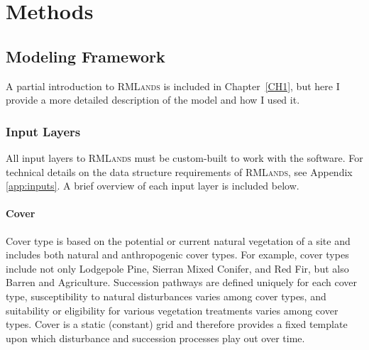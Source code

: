 
\section{Methods}
\label{sec:hrvmethods}


\subsection{Modeling Framework}
\label{sec:modelframe}

A partial introduction to \textsc{RMLands} is included in Chapter~\ref{CH1}, but here I provide a more detailed description of the model and how I used it. 

\subsubsection{Input Layers}
\label{subsec:hrvinputlayers}

All input layers to \textsc{RMLands} must be custom-built to work with the software. For technical details on the data structure requirements of \textsc{RMLands}, see Appendix \ref{app:inputs}. A brief overview of each input layer is included below.

\paragraph{Cover} Cover type is based on the potential or current natural vegetation of a site and includes both natural and anthropogenic cover types. For example, cover types include not only Lodgepole Pine, Sierran Mixed Conifer, and Red Fir, but also Barren and Agriculture. Succession pathways are defined uniquely for each cover type, susceptibility to natural disturbances varies among cover types, and suitability or eligibility for various vegetation treatments varies among cover types. Cover is a static (constant) grid and therefore provides a fixed template upon which disturbance and succession processes play out over time. 

